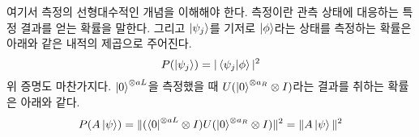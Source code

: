 \documentclass[a4paper,atbegshi,chapter,]{oblivoir}
\begin{document}
여기서 측정의 선형대수적인 개념을 이해해야 한다. 측정이란 관측 상태에 대응하는
특정 결과를 얻는 확률을 말한다. 그리고 $\ket{\psi_j}$를 기저로 
$\ket{\phi}$라는 상태를 측정하는 확률은 아래와 같은 내적의 제곱으로 주어진다.
\[
  P(\ket{\psi_j}) = |\braket{\psi_j|\phi}|^2
\]
위 증명도 마찬가지다. $\ket0^{\otimes aL}$을 측정했을 때 $U (\ket{0}^{\otimes 
a_R}\otimes I)$라는 결과를 취하는 확률은 아래와 같다. 
\[
  P(A\ket{\psi}) =
  \|(\bra0^{\otimes aL}\otimes I )U (\ket{0}^{\otimes a_R}\otimes I)\|^2
  = \|A\ket{\psi}\|^2
\]
\begin{comment}
여기서 이해해야 하는 것은 $\|\|$이라는 노름과 측정의 개념 및 회로 표현이다.
벡터 노름과 다르게 행렬, 다시 말해 변환의 크기는 어떻게 재는가? 이를 위해
사용하는 것이 \emph{유도{\tiny induced} 노름}이다. 말 그대로 벡터 노름에서
유도한 것이다. 이들 유도 노름 가운데 유도 2-노름 혹은 스펙트럼 노름을 사용할
것인데, 이는 행렬의 최대 특잇값을 말한다. 직관적으로는 행렬이 벡터를 늘릴
수 있는 최대 스케일이라고 해석할 수 있다. 또한 특잇값은 어떤 $n\times m$ 연산자
$A$가 $V$에서 $U$로의 사상이라고 하자. 각 $v_i\in V$는 $u_i\in U$와 어떤
스칼라 $\sigma_i$에 따라 아래와 같이 전개될 것이다.
\begin{align*}
  &Av_i = u_i\sigma_i \\
  \Rightarrow\; &AV = U\Sigma \\
  \Rightarrow \;& A = U\Sigma V^{\dagger}
\end{align*}
마지막 등식을 특잇값 분해라고 부르며 $\Sigma$의 원소들이 특잇값이다. 다시 말해
$\sigma_i$ 가운데 가장 큰 것이 바로 $A$의 스펙트럼 노름이다.
\[
  \|A\| = \max_{\|x\|\neq0}\frac{\|Ax\|}{\|x\|}
\]
즉 최대로 늘어난 $\|Ax\|$를 벡터 노름 $\|x\|$으로 나눈 것, 행렬이 벡터를 늘릴
수 있는 최대 스케일이다. 따라서 $\frac{A\ket{\psi}}{\|A\ket{\psi}\|}$란 
$A$라는 행렬-연산자를 $\ket{\psi}$라는 상태-벡터에 적용한 $A\ket{\psi}$를
$A\ket{\psi}$가 상태-벡터를 늘릴 수 있는 최대 스케일, 혹은 최대 특잇값으로
정규화한 것이다.
\end{comment}
\end{document}
